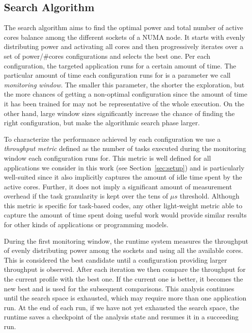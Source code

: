 \subsection{Search Algorithm}
\label{sec:algorithm}
The search algorithm aims to find the optimal power and total number of active cores
balance among the different sockets of a NUMA node.  It starts with evenly distributing
power and activating all cores and then progressively iterates over a set of power/\#cores
configurations and selects the best one.  Per each configuration, the targeted application
runs for a certain amount of time.  The particular amount of time each configuration runs
for is a parameter we call \textit{monitoring window}.  The smaller this parameter, the
shorter the exploration, but  the more chances of getting a non-optimal configuration
since the amount of time it has been trained for may not be representative of the whole
execution.  On the other hand, large window sizes significantly increase the chance of
finding the right configuration, but make the algorithmic search phase larger.

To characterize the performance achieved by each configuration we use a \textit{throughput
metric} defined as the number of tasks executed during the monitoring window each
configuration runs for.  This metric is well defined for all applications we consider in
this work (see Section~\ref{sec:setup}) and is particularly well-suited since it also
implicitly captures the amount of idle time spent by the active cores.  Further, it does
not imply a significant amount of measurement overhead if the task granularity is kept
over the tens of $\mu s$ threshold.  Although this metric is specific for task-based
codes, any other light-weight metric able to capture the amount of time spent doing useful
work would provide similar results for other kinds of applications or programming models.

During the first monitoring window, the runtime system measures the throughput of evenly
distributing power among the sockets and using all the available cores.  This is
considered the best candidate until a configuration providing larger throughput is
observed.  After each iteration we then compare the throughput for the current profile
with the best one.  If the current one is better, it becomes the new best and is used for
the subsequent comparisons.  This analysis continues until the search space is exhausted,
which may require more than one application run.  At the end of each run, if we have not
yet exhausted the search space, the runtime saves a checkpoint of the analysis state and
resumes it in a succeeding run.

